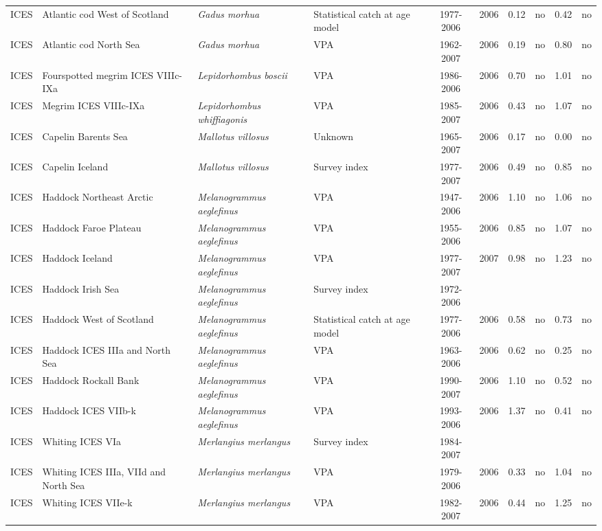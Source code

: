 \begin{longtable}{p{1.8cm}p{3.5cm}p{3.5cm}p{3cm}cccp{0.9cm}cp{0.9cm}}
  ICES & Atlantic cod West of Scotland & \textit{Gadus morhua} & Statistical catch at age model & 1977-2006 & 2006 & 0.12 & no & 0.42 & no \\ 
  ICES & Atlantic cod North Sea & \textit{Gadus morhua} & VPA & 1962-2007 & 2006 & 0.19 & no & 0.80 & no \\ 
  ICES & Fourspotted megrim ICES VIIIc-IXa & \textit{Lepidorhombus boscii} & VPA & 1986-2006 & 2006 & 0.70 & no & 1.01 & no \\ 
  ICES & Megrim ICES VIIIc-IXa & \textit{Lepidorhombus whiffiagonis} & VPA & 1985-2007 & 2006 & 0.43 & no & 1.07 & no \\ 
  ICES & Capelin Barents Sea & \textit{Mallotus villosus} & Unknown & 1965-2007 & 2006 & 0.17 & no & 0.00 & no \\ 
  ICES & Capelin Iceland & \textit{Mallotus villosus} & Survey index & 1977-2007 & 2006 & 0.49 & no & 0.85 & no \\ 
  ICES & Haddock Northeast Arctic & \textit{Melanogrammus aeglefinus} & VPA & 1947-2006 & 2006 & 1.10 & no & 1.06 & no \\ 
  ICES & Haddock Faroe Plateau & \textit{Melanogrammus aeglefinus} & VPA & 1955-2006 & 2006 & 0.85 & no & 1.07 & no \\ 
  ICES & Haddock Iceland & \textit{Melanogrammus aeglefinus} & VPA & 1977-2007 & 2007 & 0.98 & no & 1.23 & no \\ 
  ICES & Haddock Irish Sea & \textit{Melanogrammus aeglefinus} & Survey index & 1972-2006 &  &  &  &  &  \\ 
  ICES & Haddock West of Scotland & \textit{Melanogrammus aeglefinus} & Statistical catch at age model & 1977-2006 & 2006 & 0.58 & no & 0.73 & no \\ 
  ICES & Haddock ICES IIIa and North Sea & \textit{Melanogrammus aeglefinus} & VPA & 1963-2006 & 2006 & 0.62 & no & 0.25 & no \\ 
  ICES & Haddock Rockall Bank & \textit{Melanogrammus aeglefinus} & VPA & 1990-2007 & 2006 & 1.10 & no & 0.52 & no \\ 
  ICES & Haddock ICES VIIb-k & \textit{Melanogrammus aeglefinus} & VPA & 1993-2006 & 2006 & 1.37 & no & 0.41 & no \\ 
  ICES & Whiting ICES VIa & \textit{Merlangius merlangus} & Survey index & 1984-2007 &  &  &  &  &  \\ 
  ICES & Whiting ICES IIIa, VIId and North Sea & \textit{Merlangius merlangus} & VPA & 1979-2006 & 2006 & 0.33 & no & 1.04 & no \\ 
  ICES & Whiting ICES VIIe-k & \textit{Merlangius merlangus} & VPA & 1982-2007 & 2006 & 0.44 & no & 1.25 & no \\ 

\end{longtable}
